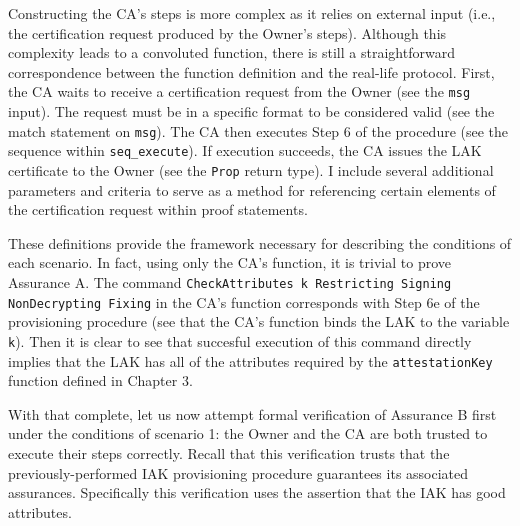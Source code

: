 Constructing the CA's steps is more complex as it relies on external input (i.e., the certification request produced by the Owner's steps). Although this complexity leads to a convoluted function, there is still a straightforward correspondence between the function definition and the real-life protocol. First, the CA waits to receive a certification request from the Owner (see the \verb|msg| input). The request must be in a specific format to be considered valid (see the match statement on \verb|msg|). The CA then executes Step 6 of the procedure (see the sequence within \verb|seq_execute|). If execution succeeds, the CA issues the LAK certificate to the Owner (see the \verb|Prop| return type). I include several additional parameters and criteria to serve as a method for referencing certain elements of the certification request within proof statements.



These definitions provide the framework necessary for describing the conditions of each scenario. 
In fact, using only the CA's function, it is trivial to prove Assurance A. The command  \verb|CheckAttributes k Restricting Signing NonDecrypting Fixing| in the CA's function corresponds with Step 6e of the provisioning procedure 
(see that the CA's function binds the LAK to the variable \verb|k|). Then it is clear to see that succesful execution of this command directly implies that the LAK has all of the attributes required by the \verb|attestationKey| function defined in Chapter 3.

With that complete, let us now attempt formal verification of Assurance B first under the conditions of scenario 1: the Owner and the CA are both trusted to execute their steps correctly. 
Recall that this verification trusts that the previously-performed IAK provisioning procedure guarantees its associated assurances. Specifically this verification uses the assertion that the IAK has good attributes.


